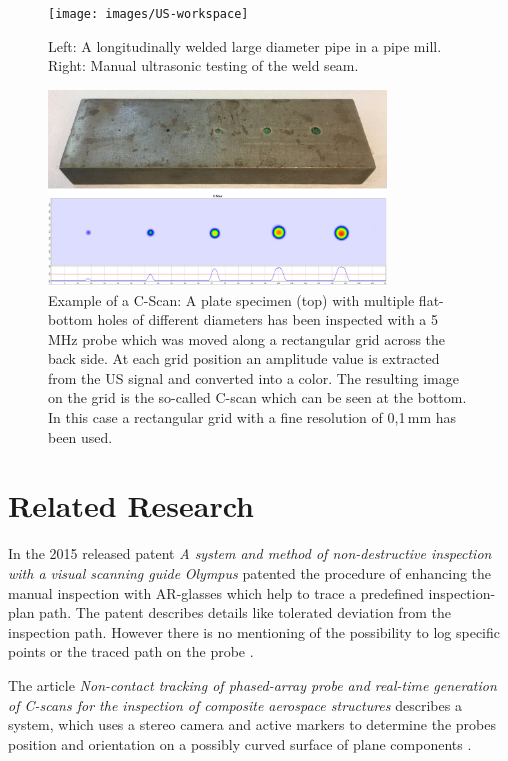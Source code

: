 \documentclass{VRARWorkshop}
\begin{document}
\begin{figure}[h!]
    \begin{center}
        \texttt{[image: images/US-workspace]}
        \caption{\label{fig:manual_UT} Left: A longitudinally welded large diameter pipe in a pipe mill. 
				Right: Manual ultrasonic testing of the weld seam.}
    \end{center}
\end{figure}
\begin{figure}[h!]
    \begin{center}
        \includegraphics[width=0.8\textwidth]{images/CScan}
        \caption{\label{fig:cScan} Example of a C-Scan: A plate specimen (top) with multiple flat-bottom holes of different diameters has been inspected with a 5 MHz probe which was moved along a rectangular grid across the back side.
        At each grid position an amplitude value is extracted from the US signal and converted into a color. The resulting image on the grid is the so-called C-scan which can be seen at the bottom.
				In this case a rectangular grid with a fine resolution of 0,1\,mm has been used.}
    \end{center}
\end{figure}

\section{Related Research}
In the 2015 released patent \textit{A system and method of non-destructive inspection with a visual scanning guide} \textit{Olympus} patented the procedure of enhancing the manual inspection with AR-glasses which help to trace a predefined inspection-plan path.
The patent describes details like tolerated deviation from the inspection path.
However there is no mentioning of the possibility to log specific points or the traced path on the probe \cite{ARPat15}.

The article \textit{Non-contact tracking of phased-array probe and real-time generation of C-scans for the inspection of composite aerospace structures} describes a system, which uses a stereo camera and active markers to determine the probes position and orientation on a possibly curved surface of plane components \cite{walter_non-contact_2007}.
\end{document}
